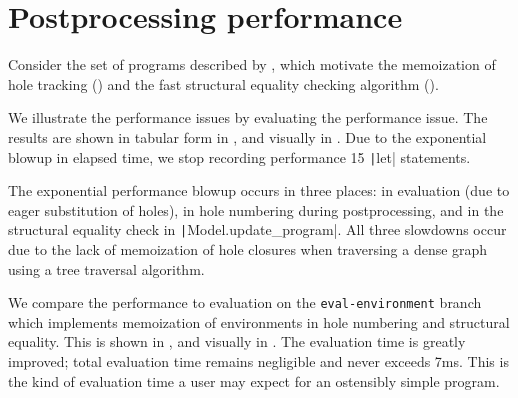 \section{Postprocessing performance}
\label{sec:evaluation-renumbering}

Consider the set of programs described by , which motivate the memoization of hole tracking () and the fast structural equality checking algorithm ().

We illustrate the performance issues by evaluating the performance issue. The results are shown in tabular form in , and visually in . Due to the exponential blowup in elapsed time, we stop recording performance 15 \texttt|let| statements.

The exponential performance blowup occurs in three places: in evaluation (due to eager substitution of holes), in hole numbering during postprocessing, and in the structural equality check in \texttt|Model.update_program|. All three slowdowns occur due to the lack of memoization of hole closures when traversing a dense graph using a tree traversal algorithm.

We compare the performance to evaluation on the \texttt{eval-environment} branch which implements memoization of environments in hole numbering and structural equality. This is shown in , and visually in . The evaluation time is greatly improved; total evaluation time remains negligible and never exceeds 7ms. This is the kind of evaluation time a user may expect for an ostensibly simple program.


